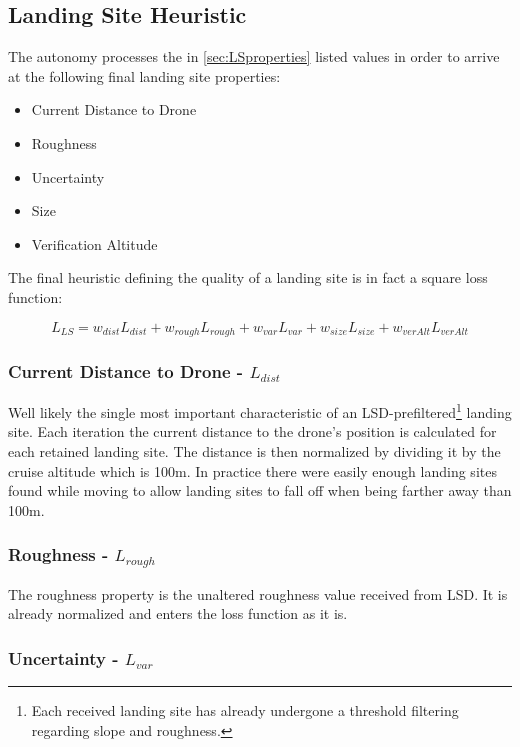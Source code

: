 \subsection{Landing Site Heuristic}

The autonomy processes the in \cref{sec:LSproperties} listed values in order to arrive at the following final landing site properties:

\begin{itemize}
    \item Current Distance to Drone
    \item Roughness
    \item Uncertainty
    \item Size
    \item Verification Altitude
\end{itemize}

The final heuristic defining the quality of a landing site is in fact a square loss function:

\begin{equation}
    L_{LS} = w_{dist}L_{dist} + w_{rough}L_{rough} + w_{var}L_{var} + w_{size}L_{size} + w_{verAlt}L_{verAlt}
    \label{eq:loss_fct}
\end{equation}

\subsubsection{Current Distance to Drone - $L_{dist}$}
Well likely the single most important characteristic of an LSD-prefiltered\footnote[1]{Each received landing site has already undergone a threshold filtering regarding slope and roughness.} landing site. Each iteration the current distance to the drone's position is calculated for each retained landing site. The distance is then normalized by dividing it by the cruise altitude which is 100m. In practice there were easily enough landing sites found while moving to allow landing sites to fall off when being farther away than 100m.

\subsubsection{Roughness - $L_{rough}$}

The roughness property is the unaltered roughness value received from LSD. It is already normalized and enters the loss function as it is. 

\subsubsection{Uncertainty - $L_{var}$}


